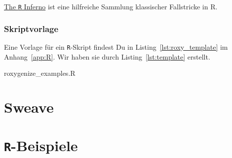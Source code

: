 \documentclass[twoside]{scrartcl}
\providecommand{\R}{\texttt{R}}
\begin{document}
\href{www.burns-stat.com/pages/Tutor/R_inferno.pdf}{The \R{} Inferno} ist eine
hilfreiche Sammlung klassischer Fallstricke in R. 
\subsubsection{Skriptvorlage}
Eine Vorlage f\"ur ein \R{}-Skript findest Du in Listing~\ref{lst:roxy_template}
im Anhang~\ref{app:R}. Wir haben sie durch Listing~\ref{lst:template} erstellt.

{roxygenize_examples.R}




\appendix
\section{Sweave\label{app:sweave}}

\pagebreak
\section{\R{}-Beispiele\label{app:R}}


%
\end{document}
